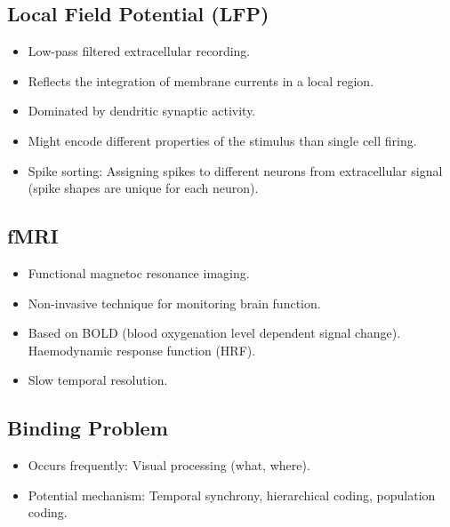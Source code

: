 \documentclass[main]{subfiles}
\begin{document}
\subsection{Local Field Potential (LFP)}
\begin{itemize}[noitemsep,nolistsep]
	\item Low-pass filtered extracellular recording.
	\item Reflects the integration of membrane currents in a local region.
	\item Dominated by dendritic synaptic activity.
	\item Might encode different properties of the stimulus than single cell firing.
	\item Spike sorting: Assigning spikes to different neurons from extracellular signal (spike shapes are unique for each neuron).
\end{itemize}

\subsection{fMRI}
\begin{itemize}[noitemsep,nolistsep]
	\item Functional magnetoc resonance imaging.
	\item Non-invasive technique for monitoring brain function.
	\item Based on BOLD (blood oxygenation level dependent signal change). Haemodynamic response function (HRF).
	\item Slow temporal resolution.
\end{itemize}

\subsection{Binding Problem}
\begin{itemize}[noitemsep,nolistsep]
	\item Occurs frequently: Visual processing (what, where).
	\item Potential mechanism: Temporal synchrony, hierarchical coding, population coding.
\end{itemize}
\end{document}
